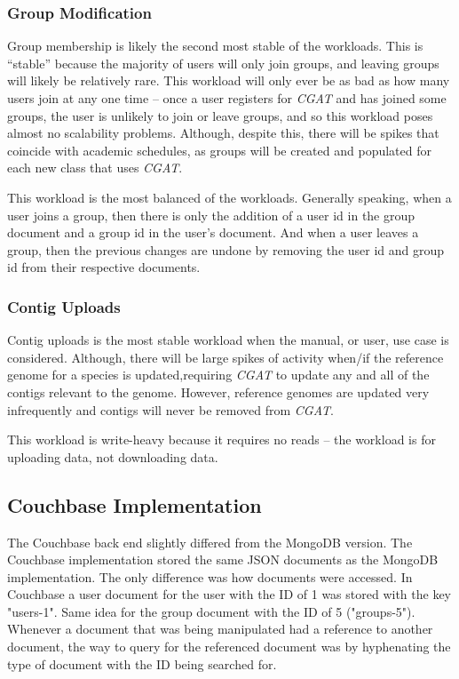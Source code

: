 \documentclass[12pt]{ucthesis}
\begin{document}
\subsubsection{Group Modification}
Group membership is likely the second most stable of the workloads. This is ``stable''
because the majority of users will only join groups, and leaving groups will
likely be relatively rare. This workload will only ever be as bad as how many
users join at any one time -- once a user registers for \textit{CGAT} and has
joined some groups, the user is unlikely to join or leave groups, and so this workload
poses almost no scalability problems. Although, despite this, there will
be spikes that coincide with academic schedules, as groups will be created and
populated for each new class that uses \textit{CGAT}.

This workload is the most balanced of the workloads. Generally speaking, when a user joins a
group, then there is only the addition of a user id in the group document and a 
group id in the user's document. And when a user leaves a group, then
the previous changes are undone by removing the user id and group id from their respective documents.

\subsubsection{Contig Uploads}
Contig uploads is the most stable workload when the manual, or user, use case
is considered. Although, there will be large spikes of activity when/if the
reference genome for a species is updated,requiring \textit{CGAT} to update
any and all of the contigs relevant to the genome. However, reference genomes
are updated very infrequently and contigs will never be removed from
\textit{CGAT}.

This workload is write-heavy because it requires no reads -- the workload is for
uploading data, not downloading data.

\subsection{Couchbase Implementation}
The Couchbase back end slightly differed from the MongoDB version. The Couchbase implementation stored
the same JSON documents as the MongoDB implementation. The only difference was how documents were accessed.
In Couchbase a user document for the user with the ID of 1 was stored with the key "users-1". Same
idea for the group document with the ID of 5 ("groups-5"). Whenever a document that was being manipulated
had a reference to another document, the way to query for the referenced document was by hyphenating the type of document with the ID being searched for.
\end{document}
